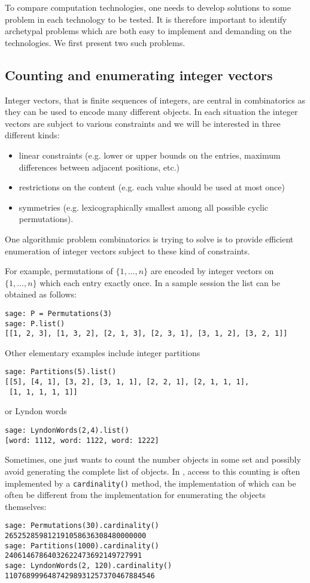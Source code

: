 \documentclass{deliverablereport}
\begin{document}
To compare computation technologies, one needs to develop solutions to some problem in
each technology to be tested. It is therefore important to identify archetypal
problems which are both easy to implement and demanding on the technologies.
We first present two such problems.

\subsection{Counting and enumerating integer vectors}
\label{subsec:intro:integer:vectors}

Integer vectors, that is finite sequences of integers, are central
in combinatorics as they can be used to encode many different
objects. In each situation the integer vectors are subject to various
constraints and we will be interested in three different kinds:
\begin{itemize}
\item linear constraints (e.g. lower or upper bounds on the entries,
maximum differences between adjacent positions, etc.)
\item restrictions on the content (e.g. each value should be used
at most once)
\item symmetries (e.g. lexicographically smallest among all possible
cyclic permutations).
\end{itemize}
One algorithmic problem combinatorics is trying to solve is to provide
efficient enumeration of integer vectors subject to these kind of
constraints.

For example, permutations of $\{1, \ldots, n\}$ are encoded by integer vectors
on $\{1, \ldots, n\}$ which each entry exactly once. In a sample
\Sage session the list can be obtained as follows:
\begin{verbatim}
sage: P = Permutations(3)
sage: P.list()
[[1, 2, 3], [1, 3, 2], [2, 1, 3], [2, 3, 1], [3, 1, 2], [3, 2, 1]]
\end{verbatim}
Other elementary examples include integer partitions
\begin{verbatim}
sage: Partitions(5).list()
[[5], [4, 1], [3, 2], [3, 1, 1], [2, 2, 1], [2, 1, 1, 1],
 [1, 1, 1, 1, 1]]
\end{verbatim}
or Lyndon words
\begin{verbatim}
sage: LyndonWords(2,4).list()
[word: 1112, word: 1122, word: 1222]
\end{verbatim}

Sometimes, one just wants to count the number objects in some set and possibly
avoid generating the complete list of objects. In \Sage, access to this
counting is often implemented by a {\tt cardinality()} method, the
implementation of which can be often be different from the implementation for
enumerating the objects themselves:
\begin{verbatim}
sage: Permutations(30).cardinality()
265252859812191058636308480000000
sage: Partitions(1000).cardinality()
24061467864032622473692149727991
sage: LyndonWords(2, 120).cardinality()
11076899964874298931257370467884546
\end{verbatim}
\end{document}
